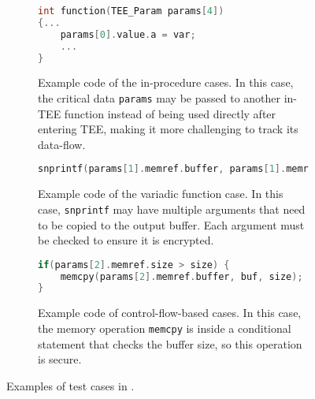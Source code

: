 \begin{figure}[t]
  \centering
  \begin{subfigure}[b]{\linewidth}
    \begin{lstlisting}[language=c++]
int function(TEE_Param params[4])
{...
    params[0].value.a = var;
    ...
}
    \end{lstlisting}
    \caption{Example code of the in-procedure cases. In this case, the critical data \texttt{params} may be passed to another in-TEE function instead of being used directly after entering TEE, making it more challenging to track its data-flow.}
    \label{f:eic}
  \end{subfigure}
  \hfill
  \begin{subfigure}[b]{\linewidth}
        \begin{lstlisting}[language=c++]
snprintf(params[1].memref.buffer, params[1].memref.size, "%s-%s-%d", key, vi, var);
    \end{lstlisting}
    \caption{Example code of the variadic function case. In this case, \texttt{snprintf} may have multiple arguments that need to be copied to the output buffer. Each argument must be checked to ensure it is encrypted.}
    \label{f:efs}
  \end{subfigure}
  \begin{subfigure}[b]{\linewidth}
        \begin{lstlisting}[language=c++]
if(params[2].memref.size > size) {
    memcpy(params[2].memref.buffer, buf, size);
}
    \end{lstlisting}
    \caption{Example code of control-flow-based cases. In this case, the memory operation \texttt{memcpy} is inside a conditional statement that checks the buffer size, so this operation is secure.}
    \label{f:eps}
  \end{subfigure}
  \caption{Examples of test cases in \ccBenchName.}
  \label{fig:cases}
\end{figure}

